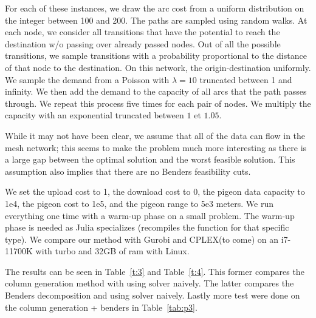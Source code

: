 \documentclass{article}
\begin{document}
    For each of these instances, we draw the arc cost from a uniform distribution on the integer between 100 and 200. The paths are sampled using random walks. At each node, we consider all transitions that have the potential to reach the destination w/o passing over already passed nodes. Out of all the possible transitions, we sample transitions with a probability proportional to the distance of that node to the destination. On this network, the origin-destination uniformly. We sample the demand from a Poisson with $\lambda=10$ truncated between 1 and infinity. We then add the demand to the capacity of all arcs that the path passes through. We repeat this process five times for each pair of nodes. We multiply the capacity with an exponential truncated between $1$ et $1.05$.


    While it may not have been clear, we assume that all of the data can flow in the mesh network; this seems to make the problem much more interesting as there is a large gap between the optimal solution and the worst feasible solution. This assumption also implies that there are no Benders feasibility cuts.


    We set the upload cost to 1, the download cost to 0, the pigeon data capacity to 1e4, the pigeon cost to 1e5, and the pigeon range to 5e3 meters. We run everything one time with a warm-up phase on a small problem. The warm-up phase is needed as Julia specializes (recompiles the function for that specific type). We compare our method with Gurobi and CPLEX(to come) on an i7-11700K with turbo and 32GB of ram with Linux.

	The results can be seen in Table~\ref{t:3} and Table~\ref{t:4}. This former compares the column generation method with using solver naively. The latter compares the Benders decomposition and using solver naively. Lastly more test were done on the column generation + benders in Table~\ref{tab:p3}.
\end{document}
